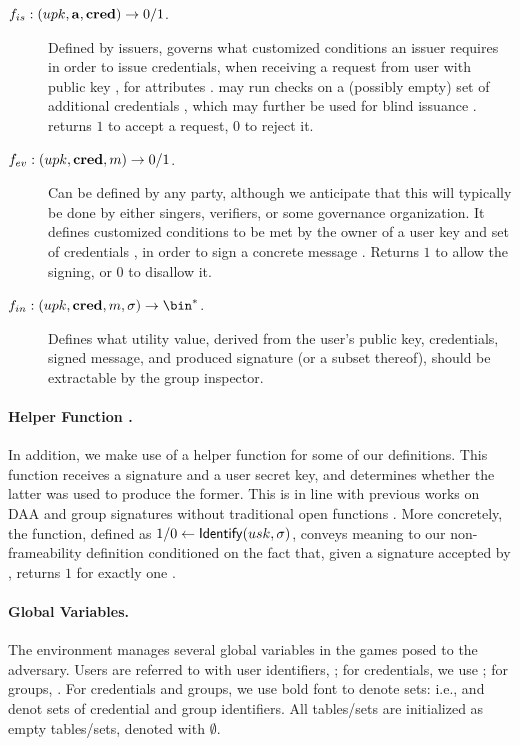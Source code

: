 \begin{description}
\item[$f_{is}: (upk, \mathbf{a},\mathbf{cred}) \rightarrow 0/1$.] Defined by issuers,
  governs what customized conditions an issuer requires in order to issue
  credentials, when receiving a request from user with public key \upk, for
  attributes \attrs. \fissue may run checks on a (possibly empty) set of
  additional credentials \scred, which may further be used for blind issuance
  . \fissue returns $1$ to accept a request, $0$ to
  reject it.  
\item[$f_{ev}: (upk,\mathbf{cred},m) \rightarrow 0/1$.] Can be defined by any party,
  although we anticipate that this will typically be done by either singers,
  verifiers, or some governance organization. It defines customized conditions
  to be met by the owner of a user key \upk and set of credentials \scred, in
  order to sign a concrete message \msg. Returns $1$ to allow the signing,
  or $0$ to disallow it.
\item[$\finsp: (\upk,\scred,\msg,\sig) \rightarrow \bin^*$.] Defines what
  utility value, derived from the user's public key, credentials, signed
  message, and produced signature (or a subset thereof), should be extractable
  by the group inspector.
\end{description}

\paragraph{Helper Function \Identify.} In addition, we make use of a helper
function \Identify for some of our definitions. This function receives
a signature and a user secret key, and determines whether the latter was used
to produce the former. This is in line with previous works on DAA
\cite{bfg+11,cdl16} and group signatures without traditional open functions
\cite{dl21,fgl21,gl19}. More concretely, the \Identify function, defined as $1/0
\gets \mathsf{Identify}(usk,\sigma)$, conveys meaning to our non-frameability definition
conditioned on the fact that, given a signature \sig accepted by \Verify,
\Identify returns $1$ for exactly one \usk.

\paragraph{Global Variables.} %
The environment manages several global variables in the games posed to the
adversary. Users are referred to with user identifiers, \uid; for credentials,
we use \cid; for groups, \gid. For credentials and groups, we use bold font to
denote sets: i.e., \scid and \sgid denot sets of credential and group
identifiers. All tables/sets are initialized as empty tables/sets, denoted
with $\emptyset$.

